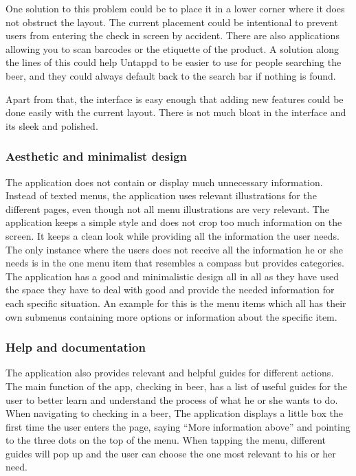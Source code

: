 \documentclass[12pt]{article}
\begin{document}
One solution to this problem could be to place it in a lower corner where it
does not obstruct the layout. The current placement could be intentional to
prevent users from entering the check in screen by accident. There are also
applications allowing you to scan barcodes or the etiquette of the product. A
solution along the lines of this could help Untappd to be easier to use for
people searching the beer, and they could always default back to the search bar
if nothing is found.


Apart from that, the interface is easy enough that adding new features could be
done easily with the current layout. There is not much bloat in the interface
and its sleek and polished.




\subsubsection{Aesthetic and minimalist design}
The application does not contain or display much unnecessary information. Instead of
texted menus, the application uses relevant illustrations for the different pages, even
though not all menu illustrations are very relevant. The application keeps a simple
style and does not crop too much information on the screen. It keeps a clean
look while providing all the information the user needs. The only instance where
the users does not receive all the information he or she needs is in the one
menu item that resembles a compass but provides categories.  The application has
a good and minimalistic design all in all as they have used the space they have
to deal with good and provide the needed information for each specific
situation. An example for this is the menu items which all has their own
submenus containing more options or information about the specific item.


\subsubsection{Help and documentation}
The application also provides relevant and helpful guides for different actions. The
main function of the app, checking in beer, has a list of useful guides for the
user to better learn and understand the process of what he or she wants to do.
When navigating to checking in a beer, The application displays a little box the first
time the user enters the page, saying “More information above” and pointing to
the three dots on the top of the menu. When tapping the menu, different guides
will pop up and the user can choose the one most relevant to his or her need. 
  
\end{document}
